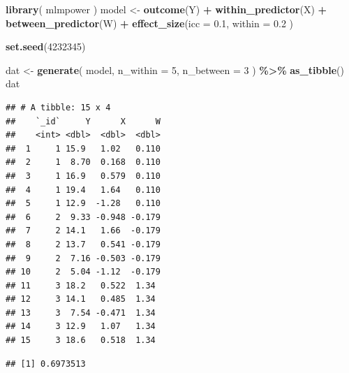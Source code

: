 \documentclass[
]{book}
\newenvironment{Shaded}{\begin{snugshade}}{\end{snugshade}}
\newcommand{\AttributeTok}[1]{\textcolor[rgb]{0.13,0.29,0.53}{#1}}
\newcommand{\DecValTok}[1]{\textcolor[rgb]{0.00,0.00,0.81}{#1}}
\newcommand{\FloatTok}[1]{\textcolor[rgb]{0.00,0.00,0.81}{#1}}
\newcommand{\FunctionTok}[1]{\textcolor[rgb]{0.13,0.29,0.53}{\textbf{#1}}}
\newcommand{\NormalTok}[1]{#1}
\newcommand{\OtherTok}[1]{\textcolor[rgb]{0.56,0.35,0.01}{#1}}
\newcommand{\SpecialCharTok}[1]{\textcolor[rgb]{0.81,0.36,0.00}{\textbf{#1}}}
\newcommand{\StringTok}[1]{\textcolor[rgb]{0.31,0.60,0.02}{#1}}
\begin{document}
\begin{Shaded}
\begin{Highlighting}[]
\FunctionTok{library}\NormalTok{( mlmpower )}
\NormalTok{model }\OtherTok{\textless{}{-}} \FunctionTok{outcome}\NormalTok{(}\StringTok{\textquotesingle{}Y\textquotesingle{}}\NormalTok{) }\SpecialCharTok{+}
  \FunctionTok{within\_predictor}\NormalTok{(}\StringTok{\textquotesingle{}X\textquotesingle{}}\NormalTok{) }\SpecialCharTok{+}
  \FunctionTok{between\_predictor}\NormalTok{(}\StringTok{\textquotesingle{}W\textquotesingle{}}\NormalTok{) }\SpecialCharTok{+}
  \FunctionTok{effect\_size}\NormalTok{(}\AttributeTok{icc =} \FloatTok{0.1}\NormalTok{,}
              \AttributeTok{within =} \FloatTok{0.2}\NormalTok{ )}

\FunctionTok{set.seed}\NormalTok{(}\DecValTok{4232345}\NormalTok{)}

\NormalTok{dat }\OtherTok{\textless{}{-}} \FunctionTok{generate}\NormalTok{( model, }
                 \AttributeTok{n\_within =} \DecValTok{5}\NormalTok{, }
                 \AttributeTok{n\_between =} \DecValTok{3}\NormalTok{ ) }\SpecialCharTok{\%\textgreater{}\%}
  \FunctionTok{as\_tibble}\NormalTok{()}
\NormalTok{dat}
\end{Highlighting}
\end{Shaded}

\begin{verbatim}
## # A tibble: 15 x 4
##    `_id`     Y      X      W
##    <int> <dbl>  <dbl>  <dbl>
##  1     1 15.9   1.02   0.110
##  2     1  8.70  0.168  0.110
##  3     1 16.9   0.579  0.110
##  4     1 19.4   1.64   0.110
##  5     1 12.9  -1.28   0.110
##  6     2  9.33 -0.948 -0.179
##  7     2 14.1   1.66  -0.179
##  8     2 13.7   0.541 -0.179
##  9     2  7.16 -0.503 -0.179
## 10     2  5.04 -1.12  -0.179
## 11     3 18.2   0.522  1.34 
## 12     3 14.1   0.485  1.34 
## 13     3  7.54 -0.471  1.34 
## 14     3 12.9   1.07   1.34 
## 15     3 18.6   0.518  1.34
\end{verbatim}

\begin{Shaded}
\end{Shaded}

\begin{verbatim}
## [1] 0.6973513
\end{verbatim}
\end{document}
